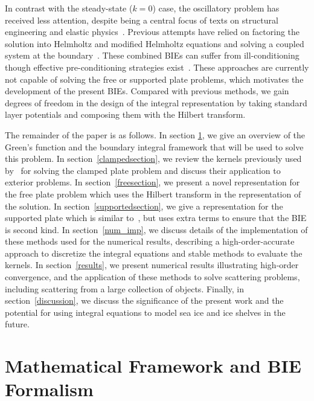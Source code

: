 \documentclass[preprint,12pt,3p]{elsarticle}
\begin{document}
In contrast with the steady-state ($k=0$) case, the oscillatory problem has received less attention, 
despite being a central focus of texts on structural engineering and elastic 
physics~\cite{timoshenko1959theory, landau59}. Previous attempts have relied on factoring the solution 
into Helmholtz and modified Helmholtz equations and solving a coupled system at the 
boundary~\cite{YUE2023100350, Dong2024, SMITH20114029}. 
These combined BIEs can suffer from ill-conditioning
though effective pre-conditioning strategies exist~\cite{Dong2024}. These approaches are currently not capable of solving the free or supported plate problems, which motivates the development of the present BIEs. Compared with previous methods, we gain degrees of freedom in the design of the integral representation by taking standard layer potentials and composing them with the Hilbert transform. 


The remainder of the paper is as follows. In section \ref{biesection}, we give an overview of the Green's function and the boundary integral framework that will be used to solve this problem. In section~\ref{clampedsection}, we review
the kernels previously used by~\cite{farkas, Lindsay2018} for solving the clamped plate problem and discuss their application to exterior 
problems. In section~\ref{freesection}, we present a novel representation for the free plate problem which uses the Hilbert transform in the representation of the solution. In section~\ref{supportedsection}, we give a representation for the supported plate which is similar to~\cite{farkas}, but uses extra terms to ensure that the BIE is second kind. In section~\ref{num_imp}, we discuss details of the implementation of these methods used for the
numerical results, describing a high-order-accurate approach to discretize the integral equations and stable methods to evaluate the kernels. In section~\ref{results}, we present numerical results illustrating high-order convergence, and the application of these methods to solve scattering problems, including scattering from a large collection of objects. Finally, in section~\ref{discussion}, we discuss the significance of the present work and the potential for using integral equations to model sea ice and ice shelves in the future. 

\section{Mathematical Framework and BIE Formalism} \label{biesection}
\end{document}
